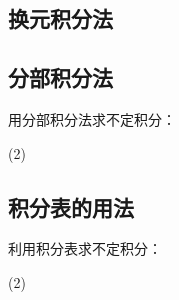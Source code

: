 \begin{Exercise}
  \begin{question}
    \item 
    \item 
    \item 
    \item 
  \end{question}
\end{Exercise}

\subsection{换元积分法}
\begin{Practice}
  \begin{question}
    \item 
    \item 
    \item 
  \end{question}
\end{Practice}

\subsection{分部积分法}
\begin{Practice}
  用分部积分法求不定积分：
  \begin{tasks}(2)
    \task
    \task
    \task
    \task
    \task
    \task
    \task
    \task
  \end{tasks}
\end{Practice}

\subsection{积分表的用法}
\begin{Practice}
  利用积分表求不定积分：
  \begin{tasks}(2)
    \task
    \task
    \task
    \task
    \task
    \task
    \task
    \task
  \end{tasks}
\end{Practice}

\begin{Exercise}
  \begin{question}
    \item 
    \item 
    \item 
    \item 
  \end{question}
\end{Exercise}

